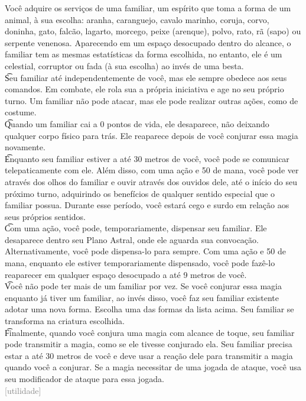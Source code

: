 \documentclass{RPG_Adventure}[2021/10/20]
\begin{document}
{\normalsize Você adquire os serviços de uma familiar, um espírito que toma a forma de um animal, à sua escolha: aranha, caranguejo, cavalo marinho, coruja, corvo, doninha, gato, falcão, lagarto, morcego, peixe (arenque), polvo, rato, rã (sapo) ou serpente venenosa. Aparecendo em um espaço desocupado dentro do alcance, o familiar tem as mesmas estatísticas da forma escolhida, no entanto, ele é um celestial, corruptor ou fada (à sua escolha) ao invés de uma besta.\\\t  Seu familiar até independentemente de você, mas ele sempre obedece aos seus comandos. Em combate, ele rola sua a própria iniciativa e age no seu próprio turno. Um familiar não pode atacar, mas ele pode realizar outras ações, como de costume.\\\t  Quando um familiar cai a 0 pontos de vida, ele desaparece, não deixando qualquer corpo físico para trás.  Ele reaparece depois de você conjurar essa magia novamente.\\\t  Enquanto seu familiar estiver a até 30 metros de você, você pode se comunicar telepaticamente com ele. Além disso, com uma ação e 50 de mana, você pode ver através dos olhos do familiar e ouvir através dos ouvidos dele, até o início do seu próximo turno, adquirindo os benefícios de qualquer sentido especial que o familiar possua. Durante esse período, você estará cego e surdo em relação aos seus próprios sentidos.\\\t  Com uma ação, você pode, temporariamente, dispensar seu familiar. Ele desaparece dentro seu Plano Astral, onde ele aguarda sua convocação. Alternativamente, você pode dispensa-lo para sempre.  Com uma ação e 50 de mana, enquanto ele estiver temporariamente dispensado, você pode fazê-lo reaparecer em qualquer espaço desocupado a até 9 metros de você.\\\t  Você não pode ter mais de um familiar por vez. Se você conjurar essa magia enquanto já tiver um familiar, ao invés disso, você faz seu familiar existente adotar uma nova forma. Escolha uma das formas da lista acima. Seu familiar se transforma na criatura escolhida.\\\t  Finalmente, quando você conjura uma magia com alcance de toque, seu familiar pode transmitir a magia, como se ele tivesse conjurado ela. Seu familiar precisa estar a até 30 metros de você e deve usar a reação dele para transmitir a magia quando você a conjurar. Se a magia necessitar de uma jogada de ataque, você usa seu modificador de ataque para essa jogada.\\}
{\scriptsize \textcolor{gray}{[utilidade]\\}}
\end{document}

